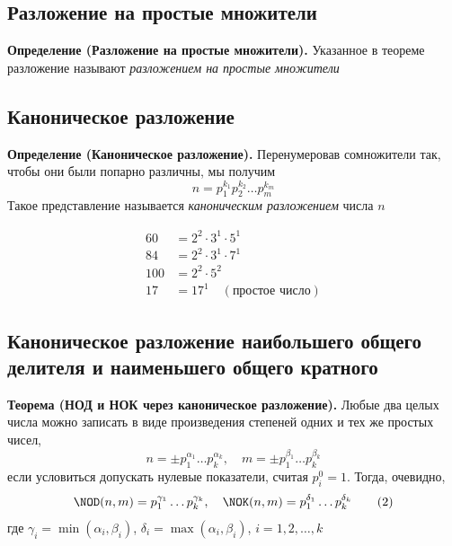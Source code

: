 \documentclass[a4paper,12pt]{article}
\theoremstyle{definition}
\theoremstyle{plain}
\theoremstyle{remark}
\begin{document}
	\subsection{Разложение на простые множители}
	
	\noindent \textbf{Определение (Разложение на простые множители).}
	Указанное в теореме разложение называют \textit{разложением на простые множители}
	
	\subsection{Каноническое разложение}
	
	\noindent \textbf{Определение (Каноническое разложение).}
	Перенумеровав сомножители так, чтобы они были попарно различны, мы получим
	\[
	n = p_1^{k_1} p_2^{k_2} \dots p_m^{k_m}
	\]
	Такое представление называется \textit{каноническим разложением} числа $n$
	
	\begin{tcolorbox}[colback=gray!5, colframe=gray!50, title=Примеры канонического разложения]
	\begin{align*}
	60 &= 2^2 \cdot 3^1 \cdot 5^1 \\
	84 &= 2^2 \cdot 3^1 \cdot 7^1 \\
	100 &= 2^2 \cdot 5^2 \\
	17 &= 17^1 \quad (\text{простое число})
	\end{align*}
	\end{tcolorbox}
	
	\subsection{Каноническое разложение наибольшего общего делителя и наименьшего общего кратного}
	
	\noindent \textbf{Теорема (НОД и НОК через каноническое разложение).}
	Любые два целых числа можно записать в виде произведения степеней одних и тех же простых чисел,
	\[
	n = \pm p_1^{\alpha_1} \dots p_k^{\alpha_k}, \quad m = \pm p_1^{\beta_1} \dots p_k^{\beta_k}
	\]
	если условиться допускать нулевые показатели, считая $p_i^0 = 1$. Тогда, очевидно,
	\[
	\NOD(n, m) = p_1^{\gamma_1} \dots p_k^{\gamma_k}, \quad \NOK(n, m) = p_1^{\delta_1} \dots p_k^{\delta_k} \tag{2}
	\]
	где $\gamma_i = \min(\alpha_i, \beta_i)$, $\delta_i = \max(\alpha_i, \beta_i)$, $i = 1, 2, \dots, k$
	
\end{document}
